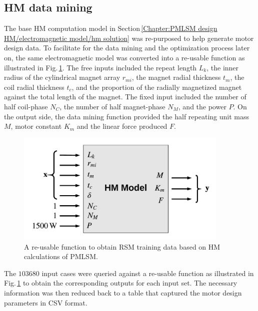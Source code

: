         \subsection{\acs{HM} data mining}           \label{Chapter:RSM/PMLSM/data mining}
        
        
            The base \acs{HM} computation model in Section\,\ref{Chapter:PMLSM design HM/electromagnetic model/hm solution} was re-purposed to help generate motor design data. To facilitate for the data mining and the optimization process later on, the same electromagnetic model was converted into a re-usable function as illustrated in Fig.\,\ref{fig:chapter/rsm/PMLSM/mining process}. The free inputs included the repeat length $L_k$, the inner radius of the cylindrical magnet array $r_{mi}$, the magnet radial thickness $t_m$, the coil radial thickness $t_c$, and the proportion of the radially magnetized magnet against the total length of the magnet. The fixed input included the number of half coil-phase $N_C$, the number of half magnet-phase $N_M$, and the power $P$. On the output side, the data mining function provided the half repeating unit mass $M$, motor constant $K_m$ and the linear force produced $F$.
        
        
            \begin{figure}
                \centering
                \includegraphics[width=4in]{chap4/images/HM_mining_for_PMLSM.pdf}
                \caption{A re-usable function to obtain \acs{RSM} training data based on \ac{HM} calculations of \ac{PMLSM}.}
                \label{fig:chapter/rsm/PMLSM/mining process}
            \end{figure}
            
            
            The $103680$ input cases were queried against a re-usable function as illustrated in Fig.\,\ref{fig:chapter/rsm/PMLSM/mining process} to obtain the corresponding outputs for each input set. The necessary information was then reduced back to a table that captured the motor design parameters in CSV format. 
            
